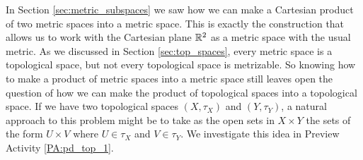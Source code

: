 \label{chap:Product_topology}


\vspace*{-17 pt}

\vspace*{13 pt}

\label{sec_prod_top}
In Section \ref{sec:metric_subspaces} we saw how we can make a Cartesian product of two metric spaces into a metric space. This is exactly the construction that allows us to work with the Cartesian plane $\mathbb{R}^2$ as a metric space with the usual metric. As we discussed in Section \ref{sec:top_spaces}, every metric space is a topological space, but not every topological space is metrizable. So knowing how to make a product of metric spaces into a metric space still leaves open the question of how we can make the product of topological spaces into a topological space. If we have two topological spaces $(X, \tau_X)$ and $(Y , \tau_Y)$, a natural approach to this problem might be to take as the open sets in $X \times Y$ the sets of the form $U \times V$ where $U \in \tau_X$  and $V \in \tau_Y$. We investigate this idea in Preview Activity \ref{PA:pd_top_1}.

